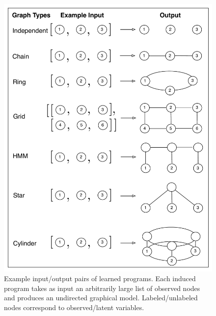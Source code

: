 \documentclass{article} %
\begin{document}
\begin{figure}[h]
\begin{minipage}[t]{.4\textwidth}

  \includegraphics[width=\linewidth]{./figures/tasks.pdf}
  \caption{Example input/output pairs of learned programs. Each induced program takes as input an arbitrarily large list of observed nodes and produces an undirected graphical model. Labeled/unlabeled nodes correspond to observed/latent variables.}
  \label{fig:tasks}
\end{minipage}
\hspace{0.2in}
\begin{minipage}[t]{.5\textwidth}

\end{minipage}
\end{figure}
\end{document}
